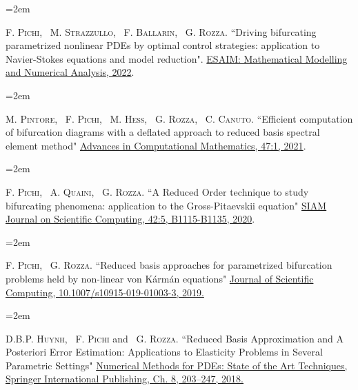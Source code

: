 \documentclass{scrartcl}
\newcommand{\MarginText}[1]{\marginpar{\raggedleft\itshape\small#1}} %
\newlength{\datebox}\settowidth{\datebox}{Spring 2011} %
\newcommand{\NewEntry}[3]{\noindent\hangindent=2em\hangafter=0 \parbox{\datebox}{\small \textit{#1}}\hspace{1.5em} #2 #3 %
\vspace{0.5em}} %
\newcommand{\Description}[1]{\hangindent=2em\hangafter=0\noindent\raggedright\footnotesize{#1}\par\normalsize\vspace{1em}} %
\begin{document}
\begin{cv}{}

\Description{\MarginText{[5]}F. \textsc{Pichi}, ~M. \textsc{Strazzullo}, ~F. \textsc{Ballarin}, ~G. \textsc{Rozza.} {\color{blue} ``Driving bifurcating parametrized nonlinear PDEs by optimal control strategies: application to Navier-Stokes equations and model reduction".} \href{https://www.esaim-m2an.org/articles/m2an/abs/2022/04/m2an200206/m2an200206.html}{ESAIM: Mathematical Modelling and Numerical Analysis, 2022}.}





\Description{\MarginText{[4]}M. \textsc{Pintore}, ~F. \textsc{Pichi}, ~M. \textsc{Hess}, ~G. \textsc{Rozza}, ~C. \textsc{Canuto.} {\color{blue} ``Efficient computation of bifurcation diagrams with a deflated approach to reduced basis spectral element method"} \href{https://link.springer.com/article/10.1007/s10444-020-09827-6}{Advances in Computational Mathematics, 47:1, 2021}.}


\Description{\MarginText{[3]}F. \textsc{Pichi}, ~A. \textsc{Quaini}, ~G. \textsc{Rozza.} {\color{blue} ``A Reduced Order technique to study bifurcating phenomena: application to the Gross-Pitaevskii equation"} \href{https://epubs.siam.org/doi/abs/10.1137/20M1313106}{SIAM Journal on Scientific Computing, 42:5, B1115-B1135, 2020}.}


\Description{\MarginText{[2]}F. \textsc{Pichi}, ~G. \textsc{Rozza.} {\color{blue} ``Reduced basis approaches for parametrized bifurcation problems held by non-linear von K\' arm\' an equations"} \href{http://link.springer.com/article/10.1007/s10915-019-01003-3}{Journal of Scientific Computing, 10.1007/s10915-019-01003-3, 2019.}}



\Description{\MarginText{[1]}D.B.P. \textsc{Huynh}, ~F. \textsc{Pichi} and ~G. \textsc{Rozza.} {\color{blue} ``Reduced Basis Approximation and A Posteriori Error Estimation: Applications to Elasticity Problems in Several Parametric Settings"} \href{https://link.springer.com/chapter/10.1007\%2F978-3-319-94676-4_8}{Numerical Methods for PDEs: State of the Art Techniques, Springer International Publishing, Ch. 8, 203--247, 2018.}}


\end{cv}
\end{document}
